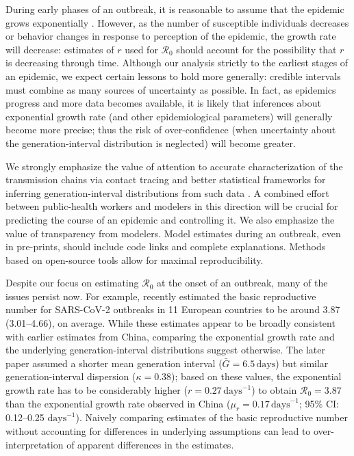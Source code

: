 \documentclass[12pt]{article}
\newcommand{\Ro}{\ensuremath{{\mathcal R}_{0}}\xspace}
\begin{document}
During early phases of an outbreak, it is reasonable to assume that the epidemic grows exponentially \citep{anderson1991infectious}.
However, as the number of susceptible individuals decreases or behavior changes in response to perception of the epidemic, the growth rate will decrease: estimates of $r$ used for \Ro should account for the possibility that $r$ is decreasing through time.
Although our analysis strictly to the earliest stages of an epidemic, we expect certain lessons to hold more generally: credible intervals must combine as many sources of uncertainty as possible. 
In fact, as epidemics progress and more data becomes available, it is likely that inferences about exponential growth rate (and other epidemiological parameters) will generally become more precise; thus the risk of over-confidence (when uncertainty about the generation-interval distribution is neglected) will become greater.

We strongly emphasize the value of attention to accurate characterization of the transmission chains via contact tracing and better statistical frameworks for inferring generation-interval distributions from such data \citep{britton2019estimation}.
A combined effort between public-health workers and modelers in this direction will be crucial for predicting the course of an epidemic and controlling it.
We also emphasize the value of transparency from modelers.
Model estimates during an outbreak, even in pre-prints, should include code links and complete explanations.
Methods based on open-source tools allow for maximal reproducibility.

Despite our focus on estimating \Ro at the onset of an outbreak, many of the issues persist now. 
For example, \cite{flaxman2020estimating} recently estimated the basic reproductive number for SARS-CoV-2 outbreaks in 11 European countries to be around 3.87 (3.01--4.66), on average.
While these estimates appear to be broadly consistent with earlier estimates from China, comparing the exponential growth rate and the underlying generation-interval distributions suggest otherwise.
The later paper assumed a shorter mean generation interval ($\bar G = 6.5\,\textrm{days}$) but similar generation-interval dispersion ($\kappa = 0.38$);
based on these values, the exponential growth rate has to be considerably higher ($r = 0.27\,\textrm{days}^{-1}$) to obtain $\Ro = 3.87$ than the exponential growth rate observed in China ($\mu_r = 0.17\,\textrm{days}^{-1}$; 95\% CI: 0.12--0.25 $\textrm{days}^{-1}$).
Naively comparing estimates of the basic reproductive number without accounting for differences in underlying assumptions can lead to over-interpretation of apparent differences in the estimates.
\end{document}
